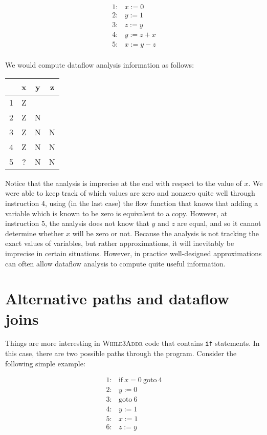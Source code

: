 \documentclass[11pt]{article}
\def\tablespace{\vspace{2ex}}
\begin{document}
\[
\begin{array}{ll}
1: & x := 0\\
2: & y := 1\\
3: & z := y\\
4: & y := z + x\\
5: & x := y - z\\
\end{array}
\]

We would compute dataflow analysis information as follows:

\tablespace
\begin{tabular}{r | c c c}

  & x & y & z \\
\hline
1 & Z &   &  \\
2 & Z & N &  \\
3 & Z & N & N\\
4 & Z & N & N\\
5 & ? & N & N\\

\end{tabular}
\tablespace

Notice that the analysis is imprecise at the end with respect to the value of
$x$.  We were able to keep track of which values are zero and nonzero quite well
through instruction 4, using (in the last case) the flow function that knows
that adding a variable which is known to be zero is equivalent to a copy.
However, at instruction 5, the analysis does not know that $y$ and $z$ are
equal, and so it cannot determine whether $x$ will be zero or not.  Because the
analysis is not tracking the exact values of variables, but rather
approximations, it will inevitably be imprecise in certain situations.  However,
in practice well-designed approximations can often allow dataflow analysis to
compute quite useful information.


\section{Alternative paths and dataflow joins}
\label{sec:if}

Things are more interesting in \textsc{While3Addr} code that contains
\texttt{if} statements.  In this case, there are two possible paths through the
program.  Consider the following simple example:

\[
\begin{array}{ll}
1: & \mbox{if}~x=0~\mbox{goto}~4\\
2: & y := 0\\
3: & \mbox{goto}~6\\
4: & y := 1\\
5: & x := 1\\
6: & z := y\\
\end{array}
\]
\end{document}
